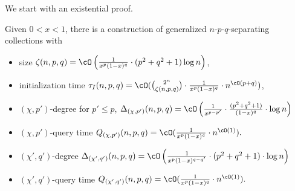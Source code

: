 We start with an existential proof. 


\begin{lemma}\label{lem:twin_sep_coll_brute_force}
Given $0<x<1$, there is a construction of generalized $n$-$p$-$q$-separating collections with 
\begin{itemize}\setlength\itemsep{-.7mm}
\item size $\zeta(n,p,q) =\cO \left(\frac{1}{x^{p}(1-x)^q} \cdot (p^2+q^2+1)\log n \right)$, 
\item initialization time $\tau_I(n,p,q) = \cO({2^n \choose \zeta(n,p,q)} \cdot \frac{1}{x^p(1-x)^q} \cdot n^{\cO(p+q)})$,
\item $(\chi,p')$-degree for $p'\leq p$, $\Delta_{(\chi,p')}(n,p,q) = \cO\left(\frac{1}{x^{p-p'}}\cdot\frac{(p^2+q^2+1)}{(1-x)^q} \cdot \log n\right)$
\item $(\chi,p')$-query time ${Q_{(\chi,p')}}(n,p,q) = \cO(\frac{1}{x^{p}(1-x)^q} \cdot n^{\cO(1)}).$
\item $(\chi',q')$-degree $\Delta_{(\chi',q')}(n,p,q)=\cO\left(\frac{1}{x^{p}(1-x)^{q-q'}}\cdot(p^2+q^2+1) \cdot \log n\right)$
\item $(\chi',q')$-query time ${Q_{(\chi',q')}}(n,p,q)=\cO(\frac{1}{x^{p}(1-x)^q} \cdot n^{\cO(1)}).$
\end{itemize}
\end{lemma}

